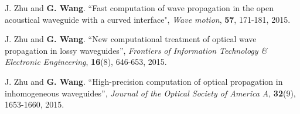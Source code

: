 \begin{publications}{99}
\item J. Zhu and {\bf G. Wang}. 
``Fast computation of wave propagation in the open acoustical waveguide with a curved interface",  {\em Wave motion}, {\bf 57}, 171-181, 2015.
\item J. Zhu and {\bf G. Wang}. 
``New computational treatment of optical wave propagation in lossy waveguides'',  {\em Frontiers of Information Technology \& Electronic Engineering}, {\bf 16}(8), 646-653, 2015.
\item  J. Zhu and {\bf G. Wang}.
``High-precision computation of optical propagation
in inhomogeneous waveguides'',  {\em Journal of the Optical Society of America A}, {\bf 32}(9), 1653-1660, 2015.


\end{publications}
